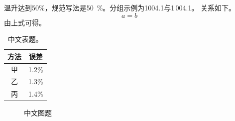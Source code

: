 \documentclass{ctexbook}
\begin{document}
温升达到50\%，规范写法是50~\%。分组示例为1004.1与1\,004.1。
关系如下。
\begin{equation}
a = b
\end{equation}
由上式可得。
\begin{table}
\caption{中文表题。}
\begin{tabular}{cc}
\toprule
方法 & 误差 \\
\midrule
甲 & 1.2\% \\
乙 & 1.3\% \\
丙 & 1.4\% \\
\bottomrule
\end{tabular}
\end{table}
\begin{figure}
\caption{中文图题}
\end{figure}
\end{document}
